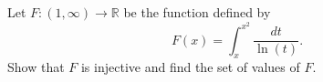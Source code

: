 Let \(F\colon(1,\infty) \rightarrow \mathbb{R}\) be the function defined by
\[F(x)=\int_{x}^{x^{2}} \frac{dt}{\ln(t)}.\]Show that \(F\) is injective and find the set of values of \(F\).